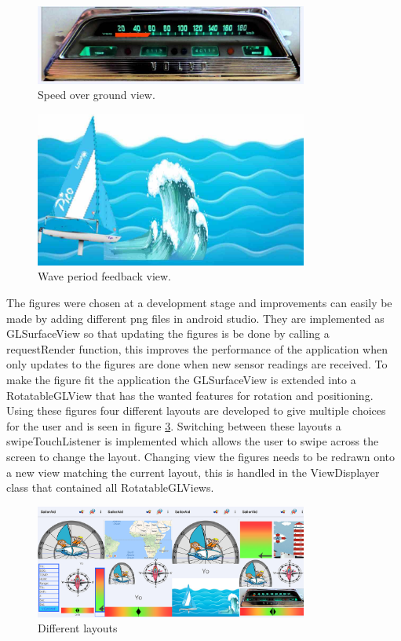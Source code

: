 \begin{figure}[H]
	\centering
	\includegraphics[width=0.8\textwidth]{Figures/sog.jpg}
	\caption{Speed over ground view.}
	\label{feedback-sog}
\end{figure}
\begin{figure}[H]
	\centering
	\includegraphics[width=0.8\textwidth]{Figures/wave.jpg}
	\caption{Wave period feedback view.}
	\label{feedback-wave}
\end{figure}
The figures were chosen at a development stage and improvements can easily be made by adding different \gls{png}\cite{png} files in android studio. They are implemented as GLSurfaceView\cite{gl} so that updating the figures is be done by calling a requestRender function, this improves the performance of the application when only updates to the figures are done when new sensor readings are received. To make the figure fit the application the GLSurfaceView is extended into a RotatableGLView that has the wanted features for rotation and positioning. Using these figures four different layouts are developed to give multiple choices for the user and is seen in figure \ref{feedback-layouts}. Switching between these layouts a swipeTouchListener is implemented which allows the user to swipe across the screen to change the layout. Changing view the figures needs to be redrawn onto a new view matching the current layout, this is handled in the ViewDisplayer class that contained all RotatableGLViews.

\begin{figure}[H]
\centering
\includegraphics[width=0.8\textwidth]{Figures/layouts.png}
\caption{Different layouts}
\label{feedback-layouts}
\end{figure}

